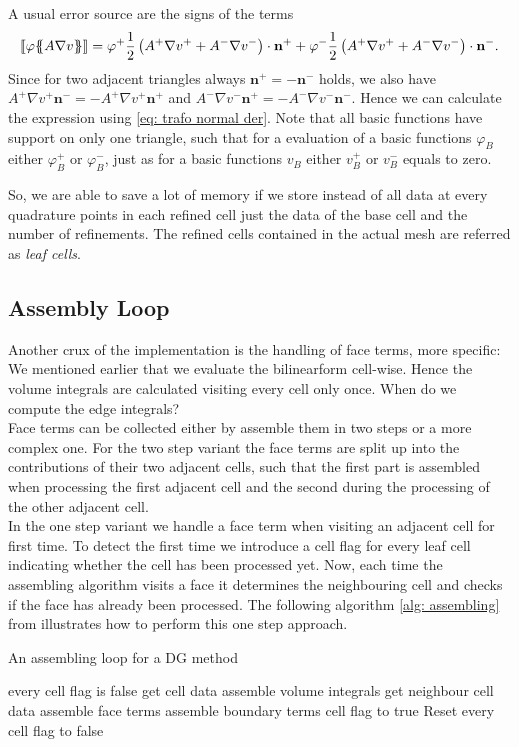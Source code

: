 \begin{definition} 
\begin{example}
A usual error source are the signs of the terms
\[
	\llbracket \varphi \{\!\!\{  A \nabla v  \}\!\!\} \rrbracket = \varphi^+ \frac 1 2  \left(A^+ \nabla v^+ + A^- \nabla v^-\right) \cdot \mathbf n^+ + \varphi^- \frac 1 2 \left(A^+ \nabla v^+ + A^- \nabla v^-\right) \cdot \mathbf n^-.
\]
Since for two adjacent triangles always $\mathbf n^+ = - \mathbf n^-$ holds, we also have $A^+ \nabla v^+ \mathbf n^-= -A^+ \nabla v^+ \mathbf n^+$ and $A^- \nabla v^- \mathbf n^+= -A^- \nabla v^- \mathbf n^-$. Hence we can calculate the expression using \ref{eq: trafo normal der}. Note that all basic functions have support on only one triangle, such that for a evaluation of a basic functions $\varphi_B$ either $\varphi_B^+$ or $\varphi_B^-$, just as for a basic functions $v_B$ either $v_B^+$ or $v_B^-$ equals to zero.

So, we are able to save a lot of memory if we store instead of all data at every quadrature points in each refined cell just the data of the base cell and the number of refinements. The refined cells contained in the actual mesh are referred as \emph{leaf cells}.
\end{example}

\subsection{Assembly Loop}
Another crux of the implementation is the handling of face terms, more specific: We mentioned earlier that we evaluate the bilinearform cell-wise. Hence the volume integrals are calculated visiting every cell only once. When do we compute the edge integrals?\\
Face terms can be collected either by assemble them in two steps or a more complex one.
For the two step variant the face terms are split up into the contributions of their two adjacent cells, such that the first part is assembled when processing the first adjacent cell and the second during the processing of the other adjacent cell. \\
In the one step variant we handle a face term when visiting an adjacent cell for first time. To detect the first time we introduce a cell flag for every leaf cell indicating whether the cell has been processed yet. Now, each time the assembling algorithm visits a face it determines the neighbouring cell and checks if the face has already been processed. The following algorithm \ref{alg: assembling} from \cite{BMV2009} illustrates how to perform this one step approach. 
\begin{algorithm}[H]
\caption{An assembling loop for a DG method}
\label{alg: assembling}
\begin{algorithmic}
\Ensure every cell flag is false
\State get cell data
\State assemble volume integrals 
					\State get neighbour cell data
					\State assemble face terms
			\EndIf
		\Else
			\State assemble boundary terms
		\EndIf
\EndFor
	\State cell flag to true 
\EndFor
\State Reset every cell flag to false
\end{algorithmic}
\end{algorithm}


\end{definition}
